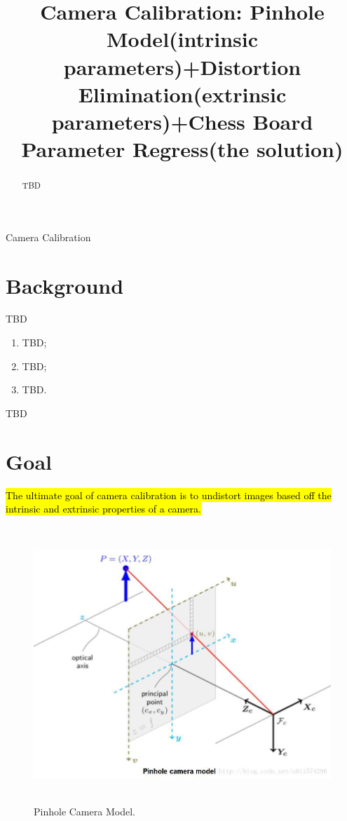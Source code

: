 \documentclass{article}
\title{Camera Calibration: Pinhole Model(intrinsic parameters)+Distortion Elimination(extrinsic parameters)+Chess Board Parameter Regress(the solution)}
\begin{document}
\ninept
%
\onecolumn
\maketitle
%
\begin{abstract}
TBD
\end{abstract}
%
\begin{keywords}
Camera Calibration
\end{keywords}



\section{Background}
\label{sec: section_Background}

TBD
	\begin{enumerate}
		\item TBD;
		\item TBD;
		\item TBD.
	\end{enumerate}
	
TBD

\section{Goal}
\label{sec:CC_goal}
\hl{The ultimate goal of camera calibration is to undistort images based off the intrinsic and extrinsic properties of a camera.}
\begin{figure}[!t]
	\centering
	\includegraphics[height=4.1in,width=5.0 in]{./img_cur/pinhole_camera_model.jpeg}
	\caption{Pinhole Camera Model.}
	\vspace{-1.0em}
	\label{fig_Pinhole}
\end{figure}
\end{document}

